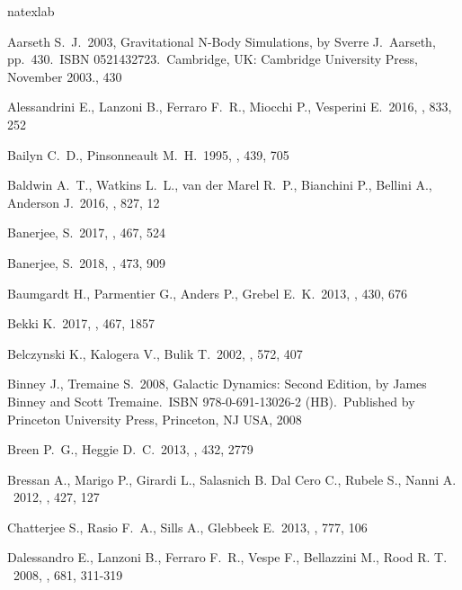 \documentclass[useAMS,usenatbib,twocolumn]{mnras}
\begin{document}
\begin{thebibliography}{57}
\expandafter\ifx\csname natexlab\endcsname\relax\def\natexlab#1{#1}\fi

 Aarseth S.~J.\ 2003, Gravitational N-Body Simulations, by Sverre J.~Aarseth, pp.~430.~ISBN 0521432723.~Cambridge, UK: Cambridge University Press, November 2003., 430 

 Alessandrini E., Lanzoni B., Ferraro F.~R., Miocchi P., Vesperini E.\ 2016, \apj, 833, 252 

 Bailyn C.~D., Pinsonneault M.~H.\ 1995, \apj, 439, 705 

 Baldwin A.~T., Watkins L.~L., van der Marel R.~P., Bianchini P., Bellini A., Anderson J.\ 2016, \apj, 827, 12 

 Banerjee, S.\ 2017, \mnras, 467, 524 

 Banerjee, S.\ 2018, \mnras, 473, 909 

 Baumgardt H., Parmentier G., Anders P., Grebel E.~K.\ 2013, \mnras, 430, 676 

 Bekki K.\ 2017, \mnras, 467, 1857

 Belczynski K., Kalogera V., Bulik T.\ 2002, \apj, 572, 407 

 Binney J., Tremaine S.\ 2008, Galactic Dynamics: Second Edition, by James Binney and Scott Tremaine.~ISBN 978-0-691-13026-2 (HB).~Published by Princeton University Press, Princeton, NJ USA, 2008

 Breen P.~G., Heggie D.~C.\ 2013, \mnras, 432, 2779 

 Bressan A., Marigo P., Girardi L., Salasnich B. Dal Cero C., Rubele S., Nanni A. \ 2012, \mnras, 427, 127

 Chatterjee S., Rasio F.~A., Sills A., Glebbeek E.\ 2013, \apj, 777, 106 

 Dalessandro E., Lanzoni B., Ferraro F.~R., Vespe F., Bellazzini M., Rood R. T. \ 2008, \apj, 681, 311-319 


\end{thebibliography}
\end{document}

